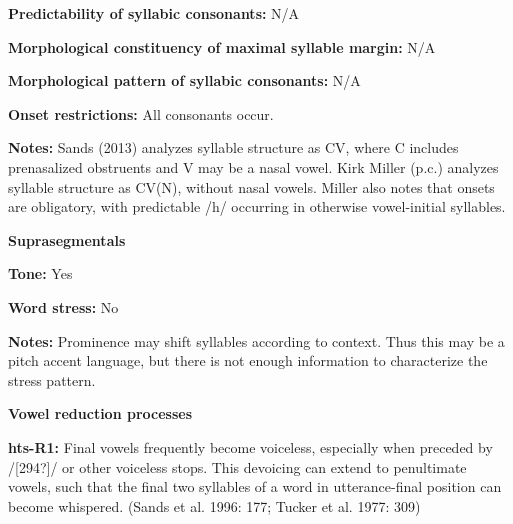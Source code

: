 \begin{styleBody}
\textbf{Predictability of syllabic consonants:} N/A
\end{styleBody}

\begin{styleBody}
\textbf{Morphological constituency of maximal syllable margin:} N/A
\end{styleBody}

\begin{styleBody}
\textbf{Morphological pattern of syllabic consonants:} N/A
\end{styleBody}

\begin{styleBody}
\textbf{Onset restrictions: }All consonants occur.
\end{styleBody}

\begin{styleBody}
\textbf{Notes: }Sands (2013) analyzes syllable structure as CV, where C includes prenasalized obstruents and V may be a nasal vowel. Kirk Miller (p.c.) analyzes syllable structure as CV(N), without nasal vowels. Miller also notes that onsets are obligatory, with predictable /h/ occurring in otherwise vowel-initial syllables.
\end{styleBody}

\begin{styleBody}
\textbf{Suprasegmentals}
\end{styleBody}

\begin{styleBody}
\textbf{Tone:} Yes
\end{styleBody}

\begin{styleBody}
\textbf{Word stress:} No
\end{styleBody}

\begin{styleBody}
\textbf{Notes:} Prominence may shift syllables according to context. Thus this may be a pitch accent language, but there is not enough information to characterize the stress pattern.
\end{styleBody}

\begin{styleBody}
\textbf{Vowel reduction processes}
\end{styleBody}

\begin{styleBody}
\textbf{hts-R1:} Final vowels frequently become voiceless, especially when preceded by /[294?]/ or other voiceless stops. This devoicing can extend to penultimate vowels, such that the final two syllables of a word in utterance-final position can become whispered. (Sands et al. 1996: 177; Tucker et al. 1977: 309)
\end{styleBody}

